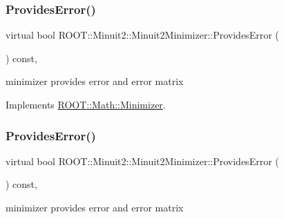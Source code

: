 \mbox{\label{classROOT_1_1Minuit2_1_1Minuit2Minimizer_a3a3a8abea38285fe639f2f0ec5505533}} 
\subsubsection{\texorpdfstring{ProvidesError()}{ProvidesError()}\hspace{0.1cm}{\footnotesize\ttfamily [1/3]}}
{\footnotesize\ttfamily virtual bool R\+O\+O\+T\+::\+Minuit2\+::\+Minuit2\+Minimizer\+::\+Provides\+Error (\begin{DoxyParamCaption}{ }\end{DoxyParamCaption}) const\hspace{0.3cm}{\ttfamily [inline]}, {\ttfamily [virtual]}}



minimizer provides error and error matrix 



Implements \mbox{\hyperlink{classROOT_1_1Math_1_1Minimizer_a71837caa295c76303c1a14679be1898d}{R\+O\+O\+T\+::\+Math\+::\+Minimizer}}.

\mbox{\label{classROOT_1_1Minuit2_1_1Minuit2Minimizer_a3a3a8abea38285fe639f2f0ec5505533}} 
\subsubsection{\texorpdfstring{ProvidesError()}{ProvidesError()}\hspace{0.1cm}{\footnotesize\ttfamily [2/3]}}
{\footnotesize\ttfamily virtual bool R\+O\+O\+T\+::\+Minuit2\+::\+Minuit2\+Minimizer\+::\+Provides\+Error (\begin{DoxyParamCaption}{ }\end{DoxyParamCaption}) const\hspace{0.3cm}{\ttfamily [inline]}, {\ttfamily [virtual]}}



minimizer provides error and error matrix 




